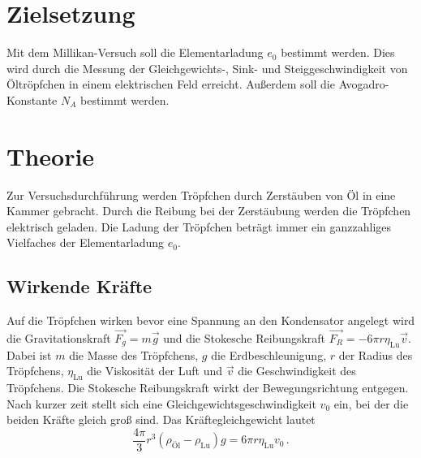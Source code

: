 \section{Zielsetzung}
\label{sec:Zielsetzung}

Mit dem Millikan-Versuch soll die Elementarladung $e_0$ bestimmt werden.
Dies wird durch die Messung der Gleichgewichts-, Sink- und Steiggeschwindigkeit von Öltröpfchen in einem elektrischen Feld erreicht.
Außerdem soll die Avogadro-Konstante $N_A$ bestimmt werden.

\section{Theorie}
\label{sec:Theorie}

Zur Versuchsdurchführung werden Tröpfchen durch Zerstäuben von Öl in eine Kammer gebracht.
Durch die Reibung bei der Zerstäubung werden die Tröpfchen elektrisch geladen.
Die Ladung der Tröpfchen beträgt immer ein ganzzahliges Vielfaches der Elementarladung $e_0$.

\subsection{Wirkende Kräfte}%
\label{sec:Wirkende Kräfte}

Auf die Tröpfchen wirken bevor eine Spannung an den Kondensator angelegt wird die Gravitationskraft $\vec{F_g} = m \vec{g}$ und die Stokesche Reibungskraft $\vec{F_R} = -6\pi r \eta_{\text{Lu}} \vec{v}$.
Dabei ist $m$ die Masse des Tröpfchens, $g$ die Erdbeschleunigung, $r$ der Radius des Tröpfchens, $\eta_{\text{Lu}}$ die Viskosität der Luft und $\vec{v}$ die Geschwindigkeit des Tröpfchens.
Die Stokesche Reibungskraft wirkt der Bewegungsrichtung entgegen.
Nach kurzer zeit stellt sich eine Gleichgewichtsgeschwindigkeit $v_0$ ein, bei der die beiden Kräfte gleich groß sind.
Das Kräftegleichgewicht lautet
\begin{equation*}
    \frac{4 \pi}{3}r^3 \left(\rho_{\text{Öl}} - \rho_{\text{Lu}}\right) g = 6 \pi r \eta_{\text{Lu}} v_0 \, .
\end{equation*}